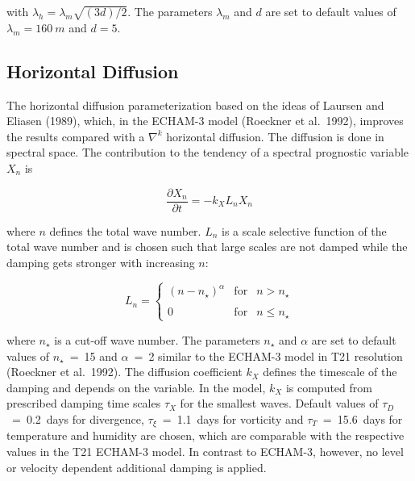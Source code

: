 with $\lambda_h = \lambda_m\sqrt{(3 d)/2}$. The
parameters $\lambda_m$ and $d$ are set to default
values
of  $\lambda_m = 160~m$  and $d= 5$.

\newpage

\subsection{Horizontal Diffusion}

The horizontal diffusion parameterization based on the
ideas of Laursen and Eliasen (1989),
which, in the ECHAM-3 model (Roeckner et al.~1992),
improves the results compared with a
${\nabla}^k$ horizontal diffusion. The  diffusion is
done in spectral space. The contribution to
the tendency of a spectral prognostic variable $X_n$ is 

\begin{equation}
\frac{\partial X_n}{\partial t} = -k_X L_n X_n
\end{equation}

where $n$ defines the total wave number. $L_n$ is a
scale selective function of the total wave
number and is chosen such that large scales are not
damped while the damping gets stronger
with increasing $n$:
  
\begin{equation}
L_n = \left\{ \begin{array}{lcl} (n-n_{\star})^{\alpha}
& \mbox{for} & n > n_{\star} \\
                                                  &&\\
                                                     0 & \mbox{for} & n
\le n_{\star} \end{array}
\right.
\end{equation}

where $n_{\star}$ is a cut-off wave number. The
parameters $n_{\star}$ and $\alpha$ are set
to default values of $n_{\star}$~=~15 and
$\alpha$~=~2 similar to the ECHAM-3 model in T21
resolution (Roeckner et al.~1992). The diffusion
coefficient $k_X$ defines the timescale of the
damping and depends on the variable. In the model,
$k_X$ is computed from prescribed
damping time scales  $\tau_X$ for the smallest waves.
Default values of 
$\tau_D$~=~0.2~days for divergence,
$\tau_{\xi}$~=~1.1~days for vorticity and
$\tau_T$~=~15.6~days for temperature and humidity
are chosen, which are comparable with
the respective values in the T21 ECHAM-3 model. In
contrast to ECHAM-3, however, no level or
velocity dependent additional damping is applied.
 
